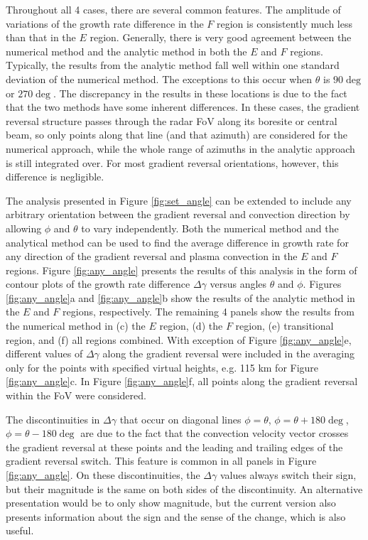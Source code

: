 Throughout all 4 cases, there are several common features. The amplitude of variations of the growth rate difference in the \(F\) region is consistently much less than that in the \(E\) region.  Generally, there is very good agreement between the numerical method and the analytic method in both the \(E\) and \(F\) regions.  Typically, the results from the analytic method fall well within one standard deviation of the numerical method.  The exceptions to this occur when \(\theta\) is \(90\deg\) or \(270\deg\).  The discrepancy in the results in these locations is due to the fact that the two methods have some inherent differences. In these cases, the gradient reversal structure passes through the radar FoV along its boresite or central beam, so only points along that line (and that azimuth) are considered for the numerical approach, while the whole range of azimuths in the analytic approach is still integrated over. For most gradient reversal orientations, however, this difference is negligible.

The analysis presented in Figure \ref{fig:set_angle} can be extended to include any arbitrary orientation between the gradient reversal and convection direction by allowing \(\phi\) and \(\theta\) to vary independently.  Both the numerical method and the analytical method can be used to find the average difference in growth rate for any direction of the gradient reversal and plasma convection in the \(E\) and \(F\) regions.  Figure \ref{fig:any_angle} presents the results of this analysis in the form of contour plots of the growth rate difference \(\Delta\gamma\) versus angles \(\theta\) and \(\phi\). Figures \ref{fig:any_angle}a and \ref{fig:any_angle}b show the results of the analytic method in the \(E\) and \(F\) regions, respectively. The remaining 4 panels show the results from the numerical method in (c) the \(E\) region, (d) the \(F\) region, (e) transitional region, and (f) all regions combined. With exception of Figure \ref{fig:any_angle}e, different values of \(\Delta\gamma\) along the gradient reversal were included in the averaging only for the points with specified virtual heights, e.g. 115 km for Figure \ref{fig:any_angle}c. In Figure \ref{fig:any_angle}f, all points along the gradient reversal within the FoV were considered.

The discontinuities in \(\Delta\gamma\) that occur on diagonal lines \(\phi=\theta\), \(\phi=\theta+180\deg\), \(\phi=\theta-180\deg\) are due to the fact that the convection velocity vector crosses the gradient reversal at these points and the leading and trailing edges of the gradient reversal switch.  This feature is common in all panels in Figure \ref{fig:any_angle}. On these discontinuities, the \(\Delta\gamma\) values always switch their sign, but their magnitude is the same on both sides of the discontinuity. An alternative presentation would be to only show magnitude, but the current version also presents information about the sign and the sense of the change, which is also useful.

